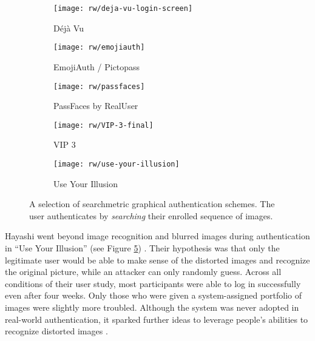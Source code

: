 	\begin{figure}[htbp]
		\centering
		\begin{subfigure}[t]{0.6\textwidth}
			\texttt{[image: rw/deja-vu-login-screen]}
			\caption{\label{fig:rw:searchmetric:dejavu}Déjà Vu \cite{Dhamija2000DejaVu}}
		\end{subfigure}
		\begin{subfigure}[t]{0.27\textwidth}
		\texttt{[image: rw/emojiauth]}
		\caption{\label{fig:rw:searchmetric:emojiauth}EmojiAuth / Pictopass \cite{Golla2017EmojiAuth, Kraus2017Emoji}}
		\end{subfigure}
		\begin{subfigure}[t]{0.26\textwidth}
			\texttt{[image: rw/passfaces]}
			\caption{\label{fig:rw:searchmetric:passfaces}PassFaces by RealUser}
		\end{subfigure}	
		\begin{subfigure}[t]{0.3\textwidth}
			\texttt{[image: rw/VIP-3-final]}
			\caption{\label{fig:rw:searchmetric:vip}VIP 3 \cite{DeAngeli2005PictureThousandWords}}
		\end{subfigure}
		\begin{subfigure}[t]{0.32\textwidth}
			\texttt{[image: rw/use-your-illusion]}
			\caption{\label{fig:rw:searchmetric:useyourillusion}Use Your Illusion \cite{Hayashi2008UseYourIllusion}}
		\end{subfigure}
		\caption{\label{fig:rw:searchmetric} A selection of searchmetric graphical authentication schemes. The user authenticates by \textit{searching} their enrolled sequence of images.}
	\end{figure}
	
	Hayashi \etal went beyond image recognition and blurred images during authentication in ``Use Your Illusion'' (see Figure \ref{fig:rw:searchmetric:useyourillusion}) \cite{Hayashi2008UseYourIllusion}. Their hypothesis was that only the legitimate user would be able to make sense of the distorted images and recognize the original picture, while an attacker can only randomly guess. Across all conditions of their user study, most participants were able to log in successfully even after four weeks. Only those who were given a system-assigned portfolio of images were slightly more troubled. Although the system was never adopted in real-world authentication, it sparked further ideas to leverage people's abilities to recognize distorted images \cite[http://arima.okoze.net/illusion/]{Castelluccia2017ImplicitVisual}. 
	
